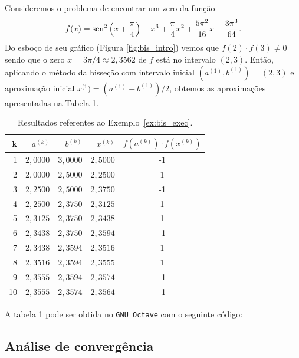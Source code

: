 \begin{ex}\label{ex:bis_exec}
  Consideremos o problema de encontrar um zero da função
\begin{equation}
  f(x) = \operatorname{sen}^2\left(x+\frac{\pi}{4}\right) - x^3 + \frac{\pi}{4}x^2 + \frac{5\pi^2}{16}x + \frac{3\pi^3}{64}.
\end{equation}
Do esboço de seu gráfico (Figura \ref{fig:bis_intro}) vemos que $f(2)\cdot f(3) \neq 0$ sendo que o zero $x=3\pi/4\approx 2,3562$ de $f$ está no intervalo $(2, 3)$. Então, aplicando o método da bisseção com intervalo inicial $(a^{(1)}, b^{(1)}) = (2, 3)$ e aproximação inicial $x^{(1}) = (a^{(1)}+b^{(1)})/2$, obtemos as aproximações apresentadas na Tabela \ref{tab:bis_exec}.

\begin{table}[h!]
  \centering
  \caption{Resultados referentes ao Exemplo~\ref{ex:bis_exec}.}
  \begin{tabular}{r|rr|r|c}
    k & $a^{(k)}$ & $b^{(k)}$ & $x^{(k)}$ & $f(a^{(k)})\cdot f(x^{(k)})$\\\hline
    1 & $2,0000$ & $3,0000$ & $2,5000$ & -1 \\
    2 & $2,0000$ & $2,5000$ & $2,2500$ &  1 \\
    3 & $2,2500$ & $2,5000$ & $2,3750$ & -1 \\
    4 & $2,2500$ & $2,3750$ & $2,3125$ & 1 \\
    5 & $2,3125$ & $2,3750$ & $2,3438$ & 1 \\
    6 & $2,3438$ & $2,3750$ & $2,3594$ &  -1 \\
    7 & $2,3438$ & $2,3594$ & $2,3516$ & 1 \\
    8 & $2,3516$ & $2,3594$ & $2,3555$ &  1 \\
    9 & $2,3555$ & $2,3594$ & $2,3574$ &  -1 \\
    10 & $2,3555$ & $2,3574$ & $2,3564$ & -1 \\\hline
  \end{tabular}
  \label{tab:bis_exec}
\end{table}

\ifisoctave
A tabela \ref{tab:bis_exec} pode ser obtida no \verb+GNU Octave+ com o seguinte \href{https://github.com/phkonzen/notas/blob/master/src/MatematicaNumerica/cap_eq1d/dados/ex_bis_exec/ex_bis_exec.m}{código}:

\fi
\end{ex}

\subsection{Análise de convergência}


